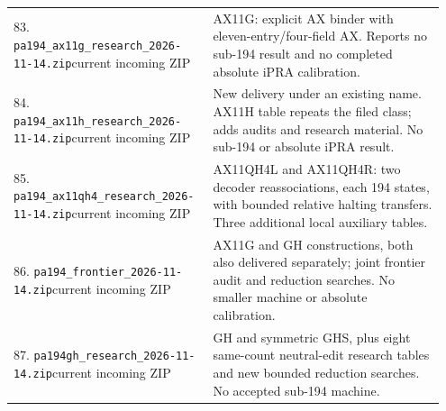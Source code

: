 \begin{longtable}{@{}p{0.43\linewidth}p{0.52\linewidth}@{}}
83. \nolinkurl{pa194_ax11g_research_2026-11-14.zip}\newline current incoming ZIP&AX11G: explicit AX binder with eleven-entry/four-field AX. Reports no sub-194 result and no completed absolute iPRA calibration.\\[5pt]
84. \nolinkurl{pa194_ax11h_research_2026-11-14.zip}\newline current incoming ZIP&New delivery under an existing name. AX11H table repeats the filed class; adds audits and research material. No sub-194 or absolute iPRA result.\\[5pt]
85. \nolinkurl{pa194_ax11qh4_research_2026-11-14.zip}\newline current incoming ZIP&AX11QH4L and AX11QH4R: two decoder reassociations, each 194 states, with bounded relative halting transfers. Three additional local auxiliary tables.\\[5pt]
86. \nolinkurl{pa194_frontier_2026-11-14.zip}\newline current incoming ZIP&AX11G and GH constructions, both also delivered separately; joint frontier audit and reduction searches. No smaller machine or absolute calibration.\\[5pt]
87. \nolinkurl{pa194gh_research_2026-11-14.zip}\newline current incoming ZIP&GH and symmetric GHS, plus eight same-count neutral-edit research tables and new bounded reduction searches. No accepted sub-194 machine.\\[5pt]
\bottomrule\end{longtable}\endgroup
